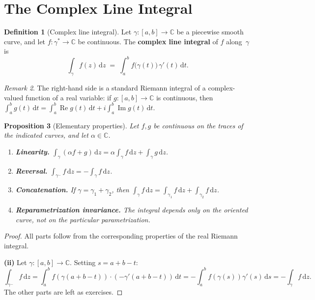 \documentclass[12pt,a4paper,openany]{book}
\theoremstyle{definition}
\newtheorem{definition}{Definition}[chapter]
\theoremstyle{plain}
\newtheorem{proposition}[definition]{Proposition}
\theoremstyle{remark}
\newtheorem{remark}[definition]{Remark}
\newcommand{\C}{\mathbb{C}}
\DeclareMathOperator{\re}{Re}
\DeclareMathOperator{\im}{Im}
\newcommand{\dd}{\mathrm{d}}
\begin{document}
\section{The Complex Line Integral}
\label{sec:complex-line-integral}

\begin{definition}[Complex line integral]\label{def:complex-line-integral}
Let $\gamma\colon[a,b]\to\C$ be a piecewise smooth curve, and let
$f\colon\gamma^*\to\C$ be continuous.  The \textbf{complex line integral}%
 of $f$ along~$\gamma$ is
\[
  \int_\gamma f(z)\,\dd z
  \;=\; \int_a^b f\bigl(\gamma(t)\bigr)\,\gamma'(t)\,\dd t.
\]
\end{definition}

\begin{remark}\label{rem:integral-well-defined}
The right-hand side is a standard Riemann integral of a complex-valued function
of a real variable: if $g\colon[a,b]\to\C$ is continuous, then
$\int_a^b g(t)\,\dd t = \int_a^b \re g(t)\,\dd t + i\int_a^b \im g(t)\,\dd t$.
\end{remark}

\begin{proposition}[Elementary properties]\label{prop:integral-properties}
Let $f,g$ be continuous on the traces of the indicated curves, and let
$\alpha\in\C$.
\begin{enumerate}[label=\textup{(\roman*)}]
  \item \textbf{Linearity.}
    $\displaystyle\int_\gamma(\alpha f+g)\,\dd z
    = \alpha\int_\gamma f\,\dd z + \int_\gamma g\,\dd z$.
  \item \textbf{Reversal.}
    $\displaystyle\int_{\gamma^-} f\,\dd z = -\int_\gamma f\,\dd z$.
  \item \textbf{Concatenation.} If $\gamma=\gamma_1+\gamma_2$, then
    $\displaystyle\int_\gamma f\,\dd z
    = \int_{\gamma_1}f\,\dd z + \int_{\gamma_2}f\,\dd z$.
  \item \textbf{Reparametrization invariance.} The integral depends only on the
    oriented curve, not on the particular parametrization.
\end{enumerate}
\end{proposition}

\begin{proof}
All parts follow from the corresponding properties of the real Riemann integral.

\textbf{(ii)} Let $\gamma\colon[a,b]\to\C$.  Setting $s = a+b-t$:
\[
  \int_{\gamma^-}f\,\dd z
  = \int_a^b f(\gamma(a+b-t))\cdot(-\gamma'(a+b-t))\,\dd t
  = -\int_a^b f(\gamma(s))\gamma'(s)\,\dd s
  = -\int_\gamma f\,\dd z.
\]
The other parts are left as exercises.
\end{proof}
\end{document}
